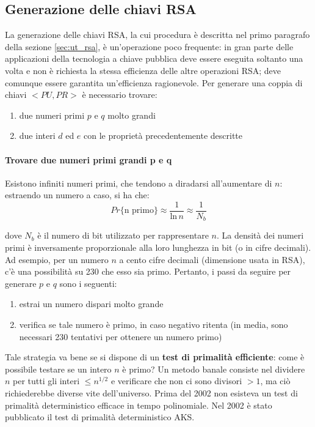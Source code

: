 \subsection{Generazione delle chiavi RSA}
La generazione delle chiavi RSA, la cui procedura è descritta nel primo paragrafo della sezione \ref{sec:ut_rsa}, è un'operazione poco frequente: in gran parte delle applicazioni della tecnologia a chiave pubblica deve essere eseguita soltanto una volta e non è richiesta la stessa efficienza delle altre operazioni RSA; deve comunque essere garantita un'efficienza ragionevole. 
\newline \newline
Per generare una coppia di chiavi $<PU,PR>$ è necessario trovare:
\begin{enumerate}
\item due numeri primi $p$ e $q$ molto grandi
\item due interi $d$ ed $e$ con le proprietà precedentemente descritte
\end{enumerate}

\paragraph{Trovare due numeri primi grandi p e q}
Esistono infiniti numeri primi, che tendono a diradarsi all'aumentare di $n$: estraendo un numero a caso, si ha che:
\begin{equation}
Pr \{\text{n primo}\} \approx \frac{1}{{\text{ln} \, n}} \approx \frac{1}{N_{b}}
\end{equation}

dove $N_{b}$ è il numero di bit utilizzato per rappresentare $n$. La densità dei numeri primi è inversamente proporzionale alla loro lunghezza in bit (o in cifre decimali). Ad esempio, per un numero $n$ a cento cifre decimali (dimensione usata in RSA), c'è una possibilità su 230 che esso sia primo. Pertanto, i passi da seguire per generare $p$ e $q$ sono i seguenti: 
\begin{enumerate}
\item estrai un numero dispari molto grande
\item verifica se tale numero è primo, in caso negativo ritenta (in media, sono necessari 230 tentativi per ottenere un numero primo)
\end{enumerate}
Tale strategia va bene se si dispone di un \textbf{test di primalità efficiente}: come è possibile testare se un intero $n$ è primo? Un metodo banale consiste nel dividere $n$ per tutti gli interi $ \le n^{1/2}$ e verificare che non ci sono divisori $> 1$, ma ciò richiederebbe diverse vite dell'universo. Prima del 2002 non esisteva un test di primalità deterministico efficace in tempo polinomiale. Nel 2002 è stato pubblicato il test di primalità deterministico AKS.

